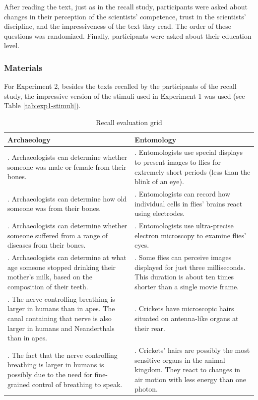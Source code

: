 \documentclass[
  english,
  doc,floatsintext]{apa6}
\begin{document}
After reading the text, just as in the recall study, participants were asked about changes in their perception of the scientists' competence, trust in the scientists' discipline, and the impressiveness of the text they read. The order of these questions was randomized. Finally, participants were asked about their education level.

\subsubsection{Materials}\label{materials-1}

For Experiment 2, besides the texts recalled by the participants of the recall study, the impressive version of the stimuli used in Experiment 1 was used (see Table \ref{tab:exp1-stimuli}).

\begin{longtable}[t]{>{\raggedright\arraybackslash}p{20em}>{\raggedright\arraybackslash}p{20em}}
\caption{\label{tab:knowledge-evaluation-grid}Recall evaluation grid}\\
\toprule
Archaeology & Entomology\\
\midrule
1. Archaeologists can determine whether someone was male or female from their bones. & 1. Entomologists use special displays to present images to flies for extremely short periods (less than the blink of an eye).\\
2. Archaeologists can determine how old someone was from their bones. & 2. Entomologists can record how individual cells in flies’ brains react using electrodes.\\
3. Archaeologists can determine whether someone suffered from a range of diseases from their bones. & 3. Entomologists use ultra-precise electron microscopy to examine flies’ eyes.\\
4. Archaeologists can determine at what age someone stopped drinking their mother’s milk, based on the composition of their teeth. & 4. Some flies can perceive images displayed for just three milliseconds. This duration is about ten times shorter than a single movie frame.\\
5. The nerve controlling breathing is larger in humans than in apes. The canal containing that nerve is also larger in humans and Neanderthals than in apes. & 5. Crickets have microscopic hairs situated on antenna-like organs at their rear.\\
\addlinespace
6. The fact that the nerve controlling breathing is larger in humans is possibly due to the need for fine-grained control of breathing to speak. & 6. Crickets' hairs are possibly the most sensitive organs in the animal kingdom. They react to changes in air motion with less energy than one photon.\\

\end{longtable}
\end{document}
